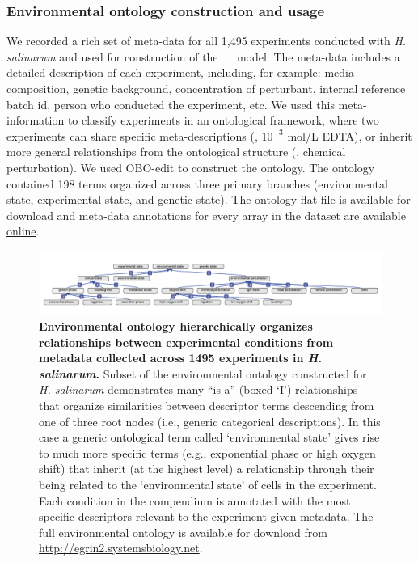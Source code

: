 \subsubsection{Environmental ontology construction and usage}

We recorded a rich set of meta-data for all 1,495 experiments conducted with {\it H. salinarum} and used for construction of the \halo~ \egrine~model. The meta-data includes a detailed description of each experiment, including, for example: media composition, genetic background, concentration of perturbant, internal reference batch id, person who conducted the experiment, etc. We used this meta-information to classify experiments in an ontological framework, where two experiments can share specific meta-descriptions (\eg, $10^{-3}$ mol/L EDTA), or inherit more general relationships from the ontological structure (\eg, chemical perturbation). We used OBO-edit \cite{day-richter_obo-editontology_2007} to construct the ontology. The ontology contained 198 terms organized across three primary branches (environmental state, experimental state, and genetic state). The ontology flat file is available for download and meta-data annotations for every array in the dataset are available \href{http://egrin2.systemsbiology.net}{online}.

\begin{figure}[h!]
\centering
\includegraphics[width=0.95\linewidth]{figures/eo.pdf}
\caption[Environmental ontology hierarchically organizes relationships between experimental conditions from metadata collected across 1495 experiments in \textit{H. salinarum}]{{\bf Environmental ontology hierarchically organizes relationships between experimental conditions from metadata collected across 1495 experiments in \textit{H. salinarum}.} Subset of the environmental ontology constructed for \textit{H. salinarum} demonstrates many “is-a” (boxed ‘I’) relationships that organize similarities between descriptor terms descending from one of three root nodes (i.e., generic categorical descriptions). In this case a generic ontological term called `environmental state' gives rise to much more specific terms (e.g., exponential phase or high oxygen shift) that inherit (at the highest level) a relationship through their being related to the ‘environmental state’ of cells in the experiment. Each condition in the compendium is annotated with the most specific descriptors relevant to the experiment given metadata. The full environmental ontology is available for download from \href{http://egrin2.systemsbiology.net}{http://egrin2.systemsbiology.net}.}
\label{fig:eo}
\end{figure}

